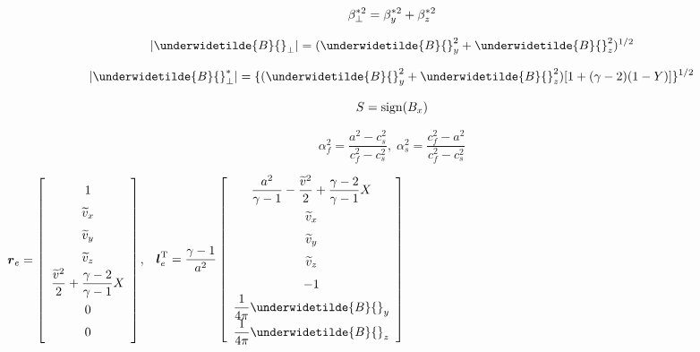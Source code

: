 \begin{equation}
\beta_{\bot}^{\ast 2} = \beta_y^{\ast 2} + \beta_z^{\ast 2}
\vspace{-8pt}
\end{equation}

\begin{equation}
| \underwidetilde{B}{}_{\bot} | = ( \underwidetilde{B}{}_{y}^{2} +
\underwidetilde{B}{}_{z}^{2} ) ^{1/2}
\vspace{-8pt}
\end{equation}

\begin{equation}
| \underwidetilde{B}{}^{\ast}_{\bot} | = \{ ( \underwidetilde{B}{}_{y}^{2} +
\underwidetilde{B}{}_{z}^{2} ) [1 + ( \gamma - 2 ) (1 - Y)]\}^{1/2}
\vspace{-8pt}
\end{equation}

\begin{equation}
S = {\rm sign} (B_{x})
\end{equation}

\begin{equation}
\alpha_{f}^2 = \frac{a^2 - c_{s}^2}{c_{f}^2 - c_{s}^2}
, \;
\alpha_{s}^2 = \frac{c_{f}^2 - a^2}{c_{f}^2 - c_{s}^2}
\end{equation}
\begin{center}
$\renewcommand{\arraystretch}{1.5}
\mbox{\boldmath $r$}_{e} =
\left[
\begin{array}{c}
1 \\
\widetilde{v}_{x} \\
\widetilde{v}_{y} \\
\widetilde{v}_{z} \\
\displaystyle
\frac{\widetilde{v}^2}{2} + \frac{\gamma -2}{\gamma -1} X \\
0 \\
0 \\
\end{array}
\right]$, $\;$
$\renewcommand{\arraystretch}{1.5}
\displaystyle
\mbox{\boldmath $l$}_{e}^{\rm T} =
\frac{\gamma - 1}{a^2}
\left[
\begin{array}{c}
\displaystyle
\frac{a^2}{\gamma -1} - \frac{\widetilde{v}^2}{2} + 
\frac{\gamma-2}{\gamma-1} X \\
\widetilde{v}_{x} \\
\widetilde{v}_{y} \\
\widetilde{v}_{z} \\
-1 \\
\displaystyle
\frac1{4 \pi} \underwidetilde{B}{}_{y} \\
\displaystyle
\frac1{4 \pi} \underwidetilde{B}{}_{z} \\
\end{array}
\right]$ 
\end{center}

